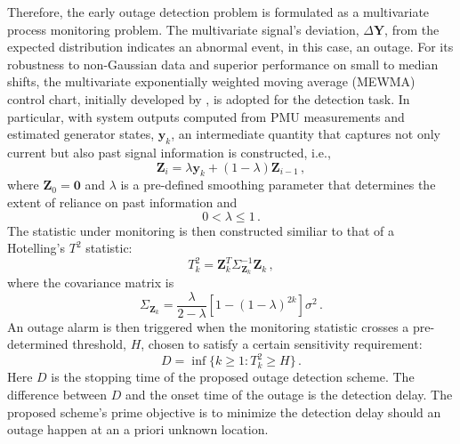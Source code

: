 Therefore, the early outage detection problem is formulated as a multivariate process monitoring problem. The multivariate signal's deviation, $\Delta \boldsymbol{Y}$, from the expected distribution indicates an abnormal event, in this case, an outage. For its robustness to non-Gaussian data and superior performance on small to median shifts, the multivariate exponentially weighted moving average (MEWMA) control chart, initially developed by \cite{lowry1992multivariate}, is adopted for the detection task. In particular, with system outputs computed from PMU measurements and estimated generator states, $\boldsymbol{y}_k$, an intermediate quantity that captures not only current but also past signal information is constructed, i.e.,
\begin{equation}
\label{ch4:eqn:ewma_z}
\boldsymbol{Z}_i = \lambda \boldsymbol{y}_k + (1 - \lambda) \boldsymbol{Z}_{i-1} \,,
\end{equation}
where $\boldsymbol{Z}_0 = \mathbf{0}$ and $\lambda$ is a pre-defined smoothing parameter that determines the extent of reliance on past information and 
$$
0<\lambda \le 1 \,.
$$
The statistic under monitoring is then constructed similiar to that of a Hotelling's $T^2$ statistic:
\begin{equation}
\label{ch4:eqn:ewma_T}
T^2_k = \boldsymbol{Z}_k^T\Sigma_{\boldsymbol{Z}_k}^{-1}\boldsymbol{Z}_k \,,
\end{equation}
where the covariance matrix is 
$$
\Sigma_{\boldsymbol{Z}_k} = \frac{\lambda}{2 - \lambda}\left[1-(1-\lambda)^{2k}\right]\sigma^2 \,.
$$
An outage alarm is then triggered when the monitoring statistic crosses a pre-determined threshold, $H$, chosen to satisfy a certain sensitivity requirement:
\begin{equation}
\label{ch4:eqn:control_chart}
D = \inf\lbrace k\ge1 : T^2_k \ge H \rbrace \,.
\end{equation}
Here $D$ is the stopping time of the proposed outage detection scheme. The difference between $D$ and the onset time of the outage is the detection delay. The proposed scheme's prime objective is to minimize the detection delay should an outage happen at an a priori unknown location.

